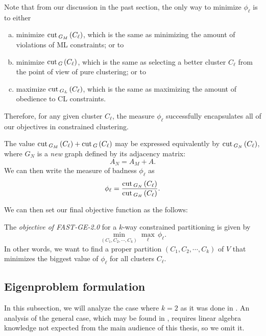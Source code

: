 Note that from our discussion in the past section, the only way to minimize $\phi_\ell$ is to either
\begin{enumerate}[(a)]
   \item minimize $\operatorname{cut\,}_{G_M\,}(C_\ell)$, which is the same as minimizing the amount of violations of ML constraints; or to
   \item minimize $\operatorname{cut\,}_{G\,}(C_\ell)$, which is the same as selecting a better cluster $C_\ell$ from the point of view of pure clustering; or to
   \item maximize $\operatorname{cut\,}_{G_L\,}(C_\ell)$, which is the same as maximizing the amount of obedience to CL constraints.
\end{enumerate}

Therefore, for any given cluster $C_\ell$, the measure $\phi_\ell$ successfully encapsulates all of our objectives in constrained clustering.

\begin{remark}
   The value $\operatorname{cut\,}_{G_M\,}(C_\ell) + \operatorname{cut\,}_{G\,}(C_\ell)$ may be expressed equivalently by $\operatorname{cut\,}_{G_N\,}(C_\ell)$, where $G_N$ is a \textit{new} graph defined by its adjacency matrix:
   \begin{equation}
      A_N = A_M+A.
   \end{equation}
   We can then write the measure of badness $\phi_\ell$ as
   \begin{equation}
      \phi_\ell = \frac{\operatorname{cut\,}_{G_N\,}(C_\ell)}{\operatorname{cut\,}_{G_H\,}(C_\ell)}.
   \end{equation}
\end{remark}

We can then set our final objective function as the follows:

\begin{definition}
   The \textit{objective of FAST-GE-2.0} for a $k$-way constrained partitioning is given by
   \begin{equation}\label{objective}
      \min_{(C_1, C_2, \cdots, C_k)} \max_{\ell} \, \phi _\ell.
   \end{equation}
   In other words, we want to find a proper partition $(C_1, C_2, \cdots, C_k)$ of $V$ that minimizes the biggest value of $\phi_\ell$ for all clusters $C_\ell$.
\end{definition}

\subsection{Eigenproblem formulation}
In this subsection, we will analyze the case where $k = 2$ as it was done in \cite{fastge2}.
An analysis of the general case, which may be found in \cite{fastge1}, requires linear algebra knowledge not expected from the main audience of this thesis, so we omit it.

